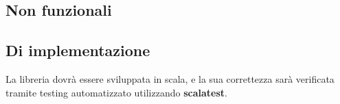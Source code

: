 \subsection{Non funzionali}



\subsection{Di implementazione}

La libreria dovrà essere sviluppata in scala, e la sua correttezza sarà verificata tramite testing automatizzato utilizzando \textbf{scalatest}.
